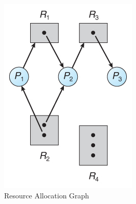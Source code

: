 \begin{figure}[h!tbp]
  \centering
  \includegraphics{./Drawings/EDAF35-Operating_Systems/Resource_Allocation_Graph.jpg}
  \caption{Resource Allocation Graph}
  \label{fig:Resource_Allocation_Graph}
\end{figure}

